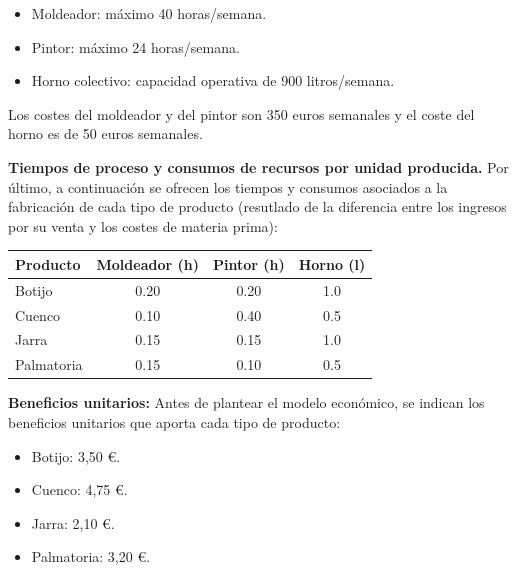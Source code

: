 \begin{itemize}

\item Moldeador: máximo 40 horas/semana.

\item Pintor: máximo 24 horas/semana.

\item Horno colectivo: capacidad operativa de 900 litros/semana.

\end{itemize}

Los costes del moldeador y del pintor son 350 euros semanales y el coste del horno es de 50 euros semanales.


\textbf{Tiempos de proceso y consumos de recursos por unidad producida.}
Por último, a continuación se ofrecen los tiempos y consumos asociados a la fabricación de cada tipo de producto (resutlado de la diferencia entre los ingresos por su venta y los costes de materia prima):



\begin{center}

\begin{tabular}{lccc}

\toprule

Producto & Moldeador (h) & Pintor (h) & Horno (l) \\

\midrule

Botijo     & 0.20 & 0.20 & 1.0 \\

Cuenco     & 0.10 & 0.40 & 0.5 \\

Jarra      & 0.15 & 0.15 & 1.0 \\

Palmatoria & 0.15 & 0.10 & 0.5 \\

\bottomrule

\end{tabular}

\end{center}



\textbf{Beneficios unitarios:}
Antes de plantear el modelo económico, se indican los beneficios unitarios que aporta cada tipo de producto:\begin{itemize}

\item Botijo: 3,50 €.

\item Cuenco: 4,75 €.

\item Jarra: 2,10 €.

\item Palmatoria: 3,20 €.

\end{itemize}



